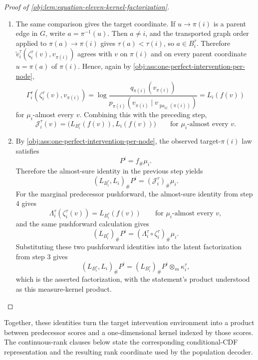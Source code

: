 \documentclass[11pt]{article}
\begin{document}
\begin{proof}[Proof of \cref{obj:lem:equation-eleven-kernel-factorization}]
\begin{enumerate}
\item The same comparison gives the target coordinate. If \(u\to\pi(i)\) is a parent edge in \(G\), write \(a=\pi^{-1}(u)\). Then \(a\ne i\), and the transported graph order applied to \(\pi(a)\to\pi(i)\) gives \(\tau(a)<\tau(i)\), so \(a\in B_i^\tau\). Therefore \(\widetilde v_i^\tau(\zeta_i^\tau(v),v_{\pi(i)})\) agrees with \(v\) on \(\pi(i)\) and on every parent coordinate \(u=\pi(a)\) of \(\pi(i)\). Hence, again by \cref{obj:ass:one-perfect-intervention-per-node},
\[
\Gamma_i^\tau(\zeta_i^\tau(v),v_{\pi(i)})
=
\log
\frac{q_{\pi(i)}(v_{\pi(i)})}
{p_{\pi(i)}(v_{\pi(i)}\mid v_{\operatorname{pa}_G(\pi(i))})}
=
L_i(f(v))
\]
for \(\mu_i\)-almost every \(v\). Combining this with the preceding step,
\[
\mathcal J_i^\tau(v)
=
\bigl(L_{B_i^\tau}(f(v)),L_i(f(v))\bigr)
\qquad
\text{for \(\mu_i\)-almost every }v .
\] %

\item By \cref{obj:ass:one-perfect-intervention-per-node}, the observed target-\(\pi(i)\) law satisfies
\[
P^i=f_{\#}\mu_i .
\]
Therefore the almost-sure identity in the previous step yields
\[
(L_{B_i^\tau},L_i)_{\#}P^i
=
(\mathcal J_i^\tau)_{\#}\mu_i .
\]
For the marginal predecessor pushforward, the almost-sure identity from step 4 gives
\[
\Lambda_i^\tau(\zeta_i^\tau(v))
=
L_{B_i^\tau}(f(v))
\qquad
\text{for \(\mu_i\)-almost every }v,
\]
and the same pushforward calculation gives
\[
(L_{B_i^\tau})_{\#}P^i
=
(\Lambda_i^\tau\circ \zeta_i^\tau)_{\#}\mu_i .
\]
Substituting these two pushforward identities into the latent factorization from step 3 gives
\[
(L_{B_i^\tau},L_i)_{\#}P^i
=
(L_{B_i^\tau})_{\#}P^i\otimes_{\!m} \kappa_i^\tau,
\]
which is the asserted factorization, with the statement's product understood as this measure-kernel product. %
\end{enumerate}
\end{proof}

Together, these identities turn the target intervention environment into a product between predecessor scores and a one-dimensional kernel indexed by those scores. The continuous-rank clauses below state the corresponding conditional-CDF representation and the resulting rank coordinate used by the population decoder.
\end{document}

